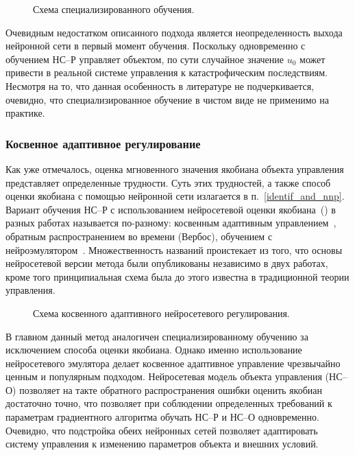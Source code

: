 \begin{figure}[h]
\centering

\caption{Схема специализированного обучения.}
\label{fig:special_nnc}
\end{figure}

Очевидным недостатком описанного подхода является неопределенность
выхода нейронной сети в первый момент обучения.  Поскольку
одновременно с обучением НС--Р управляет объектом, по сути случайное
значение $u_0$ может привести в реальной системе управления к
катастрофическим последствиям.  Несмотря на то, что данная особенность
в литературе не подчеркивается, очевидно, что специализированное
обучение в чистом виде не применимо на практике.

\subsubsection{Косвенное адаптивное регулирование}

Как уже отмечалось, оценка мгновенного значения якобиана объекта
управления представляет определенные трудности.  Суть этих трудностей,
а также способ оценки якобиана с помощью нейронной сети излагается в
п.~\ref{identif_and_nnp}.  Вариант обучения НС--Р с использованием
нейросетевой оценки якобиана~() в разных
работах называется по-разному: косвенным адаптивным
управлением~\cite{narpart92}, обратным распространением во времени
(Вербос), обучением с нейроэмулятором~\cite{sigom00}.  Множественность
названий проистекает из того, что основы нейросетевой версии метода
были опубликованы независимо в двух работах, кроме того принципиальная
схема была до этого известна в традиционной теории управления.

\begin{figure}[h]
\centering

\caption{Схема косвенного адаптивного нейросетевого регулирования.}
\label{fig:indirect_nnc}
\end{figure}

В главном данный метод аналогичен специализированному обучению за
исключением способа оценки якобиана.  Однако именно использование
нейросетевого эмулятора делает косвенное адаптивное управление
чрезвычайно ценным и популярным подходом.  Нейросетевая модель объекта
управления (НС--О) позволяет на такте обратного распространения ошибки
оценить якобиан достаточно точно, что позволяет при соблюдении
определенных требований к параметрам градиентного алгоритма обучать
НС--Р и НС--О одновременно.  Очевидно, что подстройка обеих нейронных
сетей позволяет адаптировать систему управления к изменению параметров
объекта и внешних условий.

